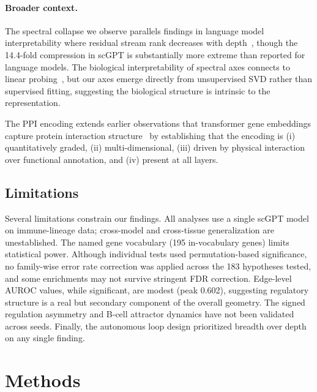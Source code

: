 \documentclass[10pt,twocolumn]{article}
\begin{document}
\paragraph{Broader context.}
The spectral collapse we observe parallels findings in language model interpretability where residual stream rank decreases with depth~\citep{sharma2024truth}, though the 14.4-fold compression in scGPT is substantially more extreme than reported for language models.
The biological interpretability of spectral axes connects to linear probing~\citep{alain2017understanding}, but our axes emerge directly from unsupervised SVD rather than supervised fitting, suggesting the biological structure is intrinsic to the representation.

The PPI encoding extends earlier observations that transformer gene embeddings capture protein interaction structure~\citep{cui2024scgpt} by establishing that the encoding is (i) quantitatively graded, (ii) multi-dimensional, (iii) driven by physical interaction over functional annotation, and (iv) present at all layers.

\subsection{Limitations}

Several limitations constrain our findings.
All analyses use a single scGPT model on immune-lineage data; cross-model and cross-tissue generalization are unestablished.
The named gene vocabulary (195 in-vocabulary genes) limits statistical power.
Although individual tests used permutation-based significance, no family-wise error rate correction was applied across the 183 hypotheses tested, and some enrichments may not survive stringent FDR correction.
Edge-level AUROC values, while significant, are modest (peak 0.602), suggesting regulatory structure is a real but secondary component of the overall geometry.
The signed regulation asymmetry and B-cell attractor dynamics have not been validated across seeds.
Finally, the autonomous loop design prioritized breadth over depth on any single finding.

\section{Methods}
\end{document}
